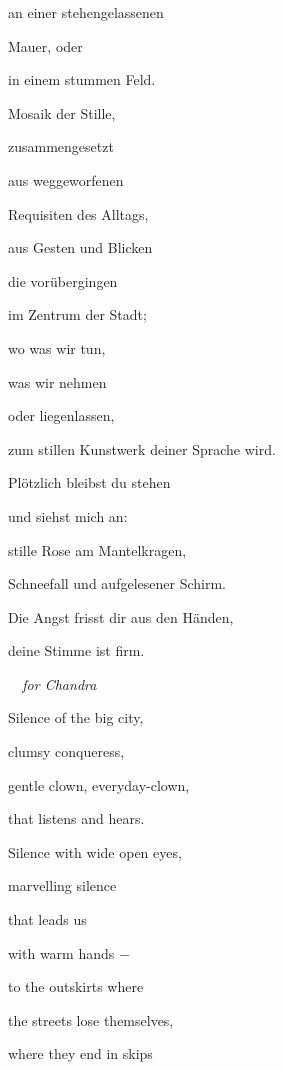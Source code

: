 \documentclass[a4paper]{article}
\begin{document}
\bigskip

an einer stehengelassenen 

Mauer, oder

in einem stummen Feld.

Mosaik der Stille, 


\bigskip

zusammengesetzt

aus weggeworfenen

Requisiten des Alltags,

aus Gesten und Blicken 


\bigskip

die vorübergingen

im Zentrum der Stadt; 

wo was wir tun,

was wir nehmen


\bigskip

oder liegenlassen,

zum stillen Kunstwerk deiner Sprache wird.

Plötzlich bleibst du stehen

und siehst mich an:


\bigskip

stille Rose am Mantelkragen,

Schneefall und aufgelesener Schirm.

Die Angst frisst dir aus den Händen,

deine Stimme ist firm.


\bigskip


{\itshape
\ \ for Chandra}


\bigskip

Silence of the big city,

clumsy conqueress,

gentle clown, everyday-clown,

that listens and hears.


\bigskip

Silence with wide open eyes,

marvelling silence

that leads us

with warm hands $-$


\bigskip

to the outskirts where

the streets lose themselves,

where they end in skips
\end{document}
